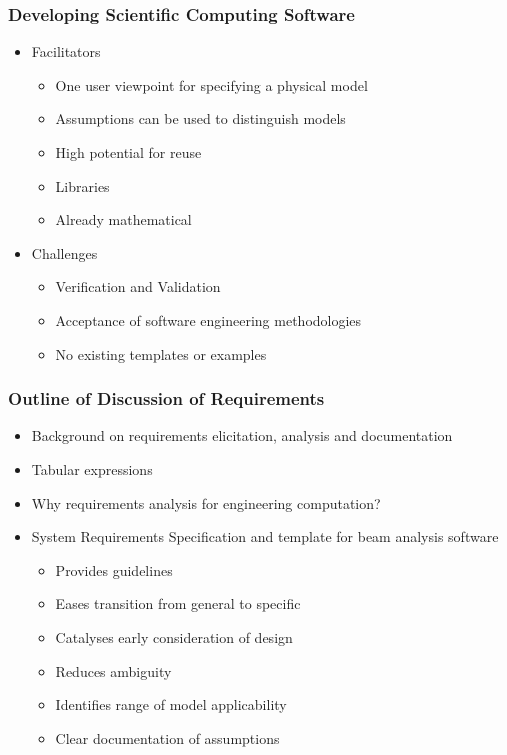 \documentclass[t,12pt,numbers,fleqn]{beamer}
\begin{document}

\begin{frame}

\frametitle{Developing Scientific Computing Software}

\begin{itemize}

\item Facilitators
\begin{itemize}
\item One user viewpoint for specifying a physical model
\item Assumptions can be used to distinguish models
\item High potential for reuse
\item Libraries
\item Already mathematical
\end{itemize}

\item Challenges
\begin{itemize}
\item Verification and Validation
\item Acceptance of software engineering methodologies
\item No existing templates or examples %
\end{itemize}

\end{itemize}

\end{frame}


\begin{frame}
\frametitle{Outline of Discussion of Requirements}

\begin{itemize}

\item Background on requirements elicitation, analysis and documentation
\item Tabular expressions
\item Why requirements analysis for engineering computation?

\item System Requirements Specification and template for beam analysis software
\begin{itemize}
\item Provides guidelines
\item Eases transition from general to specific
\item Catalyses early consideration of design
\item Reduces ambiguity
\item Identifies range of model applicability
\item Clear documentation of assumptions
\end{itemize}

\end{itemize}
\end{frame}
\end{document}
